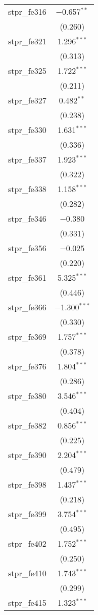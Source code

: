 \begin{table}[!htbp]
\begin{tabular}{@{\extracolsep{5pt}}lc}
  stpr\_fe316 & $-$0.657$^{**}$ \\ 
  & (0.260) \\ 
  stpr\_fe321 & 1.296$^{***}$ \\ 
  & (0.313) \\ 
  stpr\_fe325 & 1.722$^{***}$ \\ 
  & (0.211) \\ 
  stpr\_fe327 & 0.482$^{**}$ \\ 
  & (0.238) \\ 
  stpr\_fe330 & 1.631$^{***}$ \\ 
  & (0.336) \\ 
  stpr\_fe337 & 1.923$^{***}$ \\ 
  & (0.322) \\ 
  stpr\_fe338 & 1.158$^{***}$ \\ 
  & (0.282) \\ 
  stpr\_fe346 & $-$0.380 \\ 
  & (0.331) \\ 
  stpr\_fe356 & $-$0.025 \\ 
  & (0.220) \\ 
  stpr\_fe361 & 5.325$^{***}$ \\ 
  & (0.446) \\ 
  stpr\_fe366 & $-$1.300$^{***}$ \\ 
  & (0.330) \\ 
  stpr\_fe369 & 1.757$^{***}$ \\ 
  & (0.378) \\ 
  stpr\_fe376 & 1.804$^{***}$ \\ 
  & (0.286) \\ 
  stpr\_fe380 & 3.546$^{***}$ \\ 
  & (0.404) \\ 
  stpr\_fe382 & 0.856$^{***}$ \\ 
  & (0.225) \\ 
  stpr\_fe390 & 2.204$^{***}$ \\ 
  & (0.479) \\ 
  stpr\_fe398 & 1.437$^{***}$ \\ 
  & (0.218) \\ 
  stpr\_fe399 & 3.754$^{***}$ \\ 
  & (0.495) \\ 
  stpr\_fe402 & 1.752$^{***}$ \\ 
  & (0.250) \\ 
  stpr\_fe410 & 1.743$^{***}$ \\ 
  & (0.299) \\ 
  stpr\_fe415 & 1.323$^{***}$ \\ 

\end{tabular}
\end{table}

